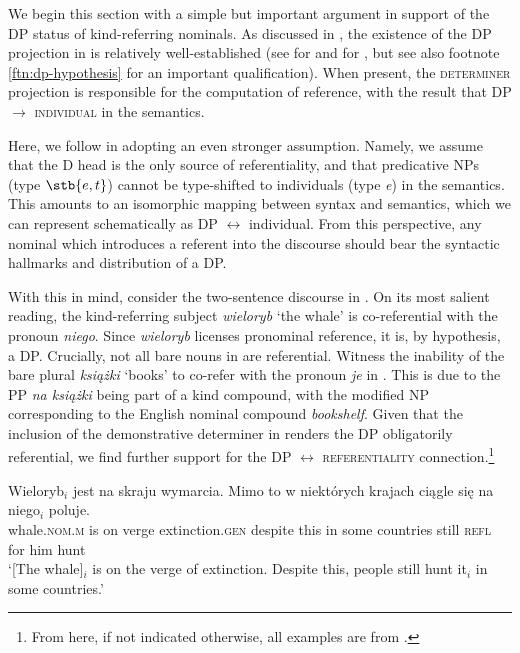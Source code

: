 \documentclass[output=paper]{langscibook}
\begin{document}
We begin this section with a simple but important argument in support of the DP status of kind-referring nominals. As discussed in , the existence of the DP projection in  is relatively well-established (see \citealt{Willim2000} for  and \citealt{Pereltsvaig2007} for , but see also footnote \ref{ftn:dp-hypothesis} for an important qualification). When present, the \textsc{determiner} projection is responsible for the computation of reference, with the result that DP $\rightarrow$ \textsc{individual} in the semantics.

Here, we follow \cite{Borer2005} in adopting an even stronger assumption. Namely, we assume that the D head is the only source of referentiality, and that predicative NPs (type $\stb{e,t}$) cannot be type-shifted to individuals (type \textit{e}) in the semantics. This amounts to an isomorphic mapping between syntax and semantics, which we can represent schematically as DP $\leftrightarrow$ individual. From this perspective, any nominal which introduces a referent into the discourse should bear the syntactic hallmarks and distribution of a DP.
\largerpage %

With this in mind, consider the two-sentence discourse in . On its most salient reading, the kind-referring subject \textit{wieloryb} `the whale' is co-referential with the pronoun \textit{niego}. Since \textit{wieloryb} licenses pronominal reference, it is, by hypothesis, a DP. Crucially, not all bare nouns in  are referential. Witness the inability of the bare plural \textit{książki} `books' to co-refer with the pronoun \textit{je} in . This is due to the PP \textit{na książki} being part of a kind compound, with the modified NP corresponding to the English nominal compound \textit{bookshelf}. Given that the inclusion of the demonstrative determiner in  renders the DP obligatorily referential, we find further support for the DP $\leftrightarrow$ \textsc{referentiality} connection.\footnote{From here, if not indicated otherwise, all examples are from .}

\ea \gll
Wieloryb$_i$ jest na skraju wymarcia. Mimo to w niektórych krajach ciągle się na niego$_i$ poluje.\\
whale.\textsc{nom.m} is on verge extinction.\textsc{gen} despite this in some countries still \textsc{refl} for him hunt\\
\glt `[The whale]$_i$ is on the verge of extinction. Despite this, people still hunt it$_i$ in some countries.' \label{ex:whale_ref}
\z
\end{document}
